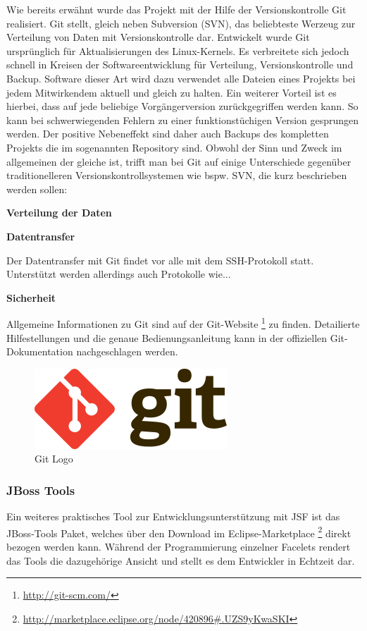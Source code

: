 \documentclass[12pt, twoside, a4paper, ngerman]{article}
\newcommand{\iz}[2]{#1 {\renewcommand{\baselinestretch}{1}\footnote{#2}}} %
\renewcommand{\baselinestretch}{1.5}
\begin{document}
Wie bereits erwähnt wurde das Projekt mit der Hilfe der Versionskontrolle Git realisiert. Git stellt, gleich neben \gls{Subversion} (SVN), das beliebteste Werzeug zur Verteilung von Daten mit Versionskontrolle dar.
Entwickelt wurde Git ursprünglich für Aktualisierungen des Linux-Kernels. Es verbreitete sich jedoch schnell in Kreisen der Softwareentwicklung für Verteilung, Versionskontrolle und Backup.
Software dieser Art wird dazu verwendet alle Dateien eines Projekts bei jedem Mitwirkendem aktuell und gleich zu halten. Ein weiterer Vorteil ist es hierbei, dass auf jede beliebige Vorgängerversion zurückgegriffen werden kann. So kann bei schwerwiegenden Fehlern zu einer funktionstüchigen Version gesprungen werden. Der positive Nebeneffekt sind daher auch Backups des kompletten Projekts die im sogenannten Repository sind. 
Obwohl der Sinn und Zweck im allgemeinen der gleiche ist, trifft man bei Git auf einige Unterschiede gegenüber traditionelleren Versionskontrollsystemen wie bspw. SVN, die kurz beschrieben werden sollen:

\textbf{Verteilung der Daten}

\textbf{Datentransfer}

Der Datentransfer mit Git findet vor alle mit dem SSH-Protokoll statt. Unterstützt werden allerdings auch Protokolle wie...

\textbf{Sicherheit}
   
Allgemeine Informationen zu Git sind auf der \iz{Git-Website}{\url{http://git-scm.com/}} zu finden. Detailierte Hilfestellungen und die genaue Bedienungsanleitung kann in der offiziellen Git-Dokumentation \cite{GitDoku} nachgeschlagen werden. 
   

\begin{figure}
 \begin{center}
   \includegraphics[scale=0.5]{img/git_logo.png}
 \end{center}
 \caption[\textbf{Git Logo \url{http://upload.wikimedia.org/wikipedia/commons/thumb/e/e0/Git-logo.svg/273px-Git-logo.svg.png}}]{Git Logo}
 \label{fig:git_logo}
\end{figure}

\subsubsection{JBoss Tools}
Ein weiteres praktisches Tool zur Entwicklungsunterstützung mit \ac{JSF} ist das JBoss-Tools Paket, welches über den Download im \iz{Eclipse-Marketplace}{\url{http://marketplace.eclipse.org/node/420896\#.UZS9yKwaSKI}} direkt bezogen werden kann.
Während der Programmierung einzelner Facelets rendert das Tools die dazugehörige Ansicht und stellt es dem Entwickler in Echtzeit dar. 
\end{document}
